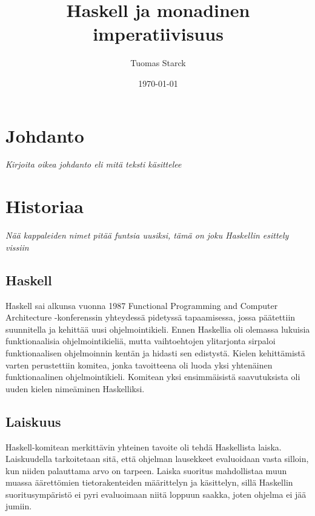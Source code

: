 \documentclass[finnish]{tktltiki2}
\title{Haskell ja monadinen imperatiivisuus}
\author{Tuomas Starck}
\date{\today}
\begin{document}
\frontmatter

\maketitle
\makeabstract

\tableofcontents

\mainmatter

\newcommand{\arr}[0]{\rightarrow}
\newcommand{\code}[1]{\texttt{#1}}
\newcommand{\fixme}[1]{\emph{#1}}


\section{Johdanto}


\fixme{Kirjoita oikea johdanto eli mitä teksti käsittelee}


\section{Historiaa}

\fixme{Nää kappaleiden nimet pitää funtsia uusiksi, tämä on joku Haskellin esittely vissiin}

\subsection{Haskell}

Haskell sai alkunsa vuonna 1987 Functional Programming and Computer Architecture -konferenssin
yhteydessä pidetyssä tapaamisessa, jossa päätettiin suunnitella ja kehittää uusi ohjelmointikieli.
Ennen Haskellia oli olemassa lukuisia funktionaalisia ohjelmointikieliä, mutta vaihtoehtojen
ylitarjonta sirpaloi funktionaalisen ohjelmoinnin kentän ja hidasti sen edistystä. Kielen
kehittämistä varten perustettiin komitea, jonka tavoitteena oli luoda yksi yhtenäinen
funktionaalinen ohjelmointikieli. Komitean yksi ensimmäisistä saavutuksista oli uuden kielen
nimeäminen Haskelliksi.

\subsection{Laiskuus}
\label{subsec:laiskuus}

Haskell-komitean merkittävin yhteinen tavoite oli tehdä Haskellista laiska. Laiskuudella
tarkoitetaan sitä, että ohjelman lausekkeet evaluoidaan vasta silloin, kun niiden palauttama arvo on
tarpeen. Laiska suoritus mahdollistaa muun muassa äärettömien tietorakenteiden määrittelyn ja
käsittelyn, sillä Haskellin suoritusympäristö ei pyri evaluoimaan niitä loppuun saakka, joten
ohjelma ei jää jumiin.
\end{document}
